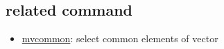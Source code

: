 \documentclass[a4paper]{jarticle}
\begin{document}
\subsection*{related command}
\begin{itemize}
\item \href{run:mvcommon.pdf}{mvcommon}: select common elements of vector 
\end{itemize}
\end{document}
